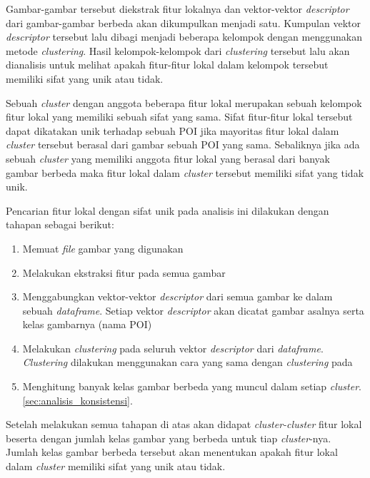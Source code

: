 Gambar-gambar tersebut diekstrak fitur lokalnya dan vektor-vektor \textit{descriptor} dari gambar-gambar berbeda akan dikumpulkan menjadi satu. Kumpulan vektor \textit{descriptor} tersebut lalu dibagi menjadi beberapa kelompok dengan menggunakan metode \textit{clustering}. Hasil kelompok-kelompok dari \textit{clustering} tersebut lalu akan dianalisis untuk melihat apakah fitur-fitur lokal dalam kelompok tersebut memiliki sifat yang unik atau tidak.

Sebuah \textit{cluster} dengan anggota beberapa fitur lokal merupakan sebuah kelompok fitur lokal yang memiliki sebuah sifat yang sama. Sifat fitur-fitur lokal tersebut dapat dikatakan unik terhadap sebuah POI jika mayoritas fitur lokal dalam \textit{cluster} tersebut berasal dari gambar sebuah POI yang sama. Sebaliknya jika ada sebuah \textit{cluster} yang memiliki anggota fitur lokal yang berasal dari banyak gambar berbeda maka fitur lokal dalam \textit{cluster} tersebut memiliki sifat yang tidak unik.

Pencarian fitur lokal dengan sifat unik pada analisis ini dilakukan dengan tahapan sebagai berikut:
\begin{enumerate}
	\item Memuat \textit{file} gambar yang digunakan
	\item Melakukan ekstraksi fitur pada semua gambar
	\item Menggabungkan vektor-vektor \textit{descriptor} dari semua gambar ke dalam sebuah \textit{dataframe}. Setiap vektor \textit{descriptor} akan dicatat gambar asalnya serta kelas gambarnya (nama POI)
	\item Melakukan \textit{clustering} pada seluruh vektor \textit{descriptor} dari \textit{dataframe}. \textit{Clustering} dilakukan menggunakan cara yang sama dengan \textit{clustering} pada 
	\item Menghitung banyak kelas gambar berbeda yang muncul dalam setiap \textit{cluster}. \ref{sec:analisis_konsistensi}.
\end{enumerate}
Setelah melakukan semua tahapan di atas akan didapat \textit{cluster-cluster} fitur lokal beserta dengan jumlah kelas gambar yang berbeda untuk tiap \textit{cluster}-nya. Jumlah kelas gambar berbeda tersebut akan menentukan apakah fitur lokal dalam \textit{cluster} memiliki sifat yang unik atau tidak. 

